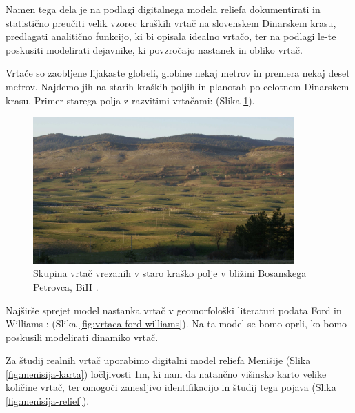 \documentclass[a4paper, twoside, 12pt]{book}
\begin{document}
  Namen tega dela je na podlagi digitalnega modela reliefa dokumentirati in statistično preučiti velik vzorec kraških vrtač na slovenskem Dinarskem krasu, predlagati analitično funkcijo, ki bi opisala idealno vrtačo, ter na podlagi le-te poskusiti modelirati dejavnike, ki povzročajo nastanek in obliko vrtač.

Vrtače so zaobljene lijakaste globeli, globine nekaj metrov in premera nekaj deset metrov. Najdemo jih na starih kraških poljih in planotah po celotnem Dinarskem krasu. Primer starega polja z razvitimi vrtačami: (Slika \ref{fig:vrtace-bpetrovac}). 

  \begin{figure}[h]
    \begin{center}
      \includegraphics[width=10cm]{slike/bpetrovac}
    \end{center}
    \caption{Skupina vrtač vrezanih v staro kraško polje v bližini Bosanskega Petrovca, BiH \cite{bpetrovac}.}
    \label{fig:vrtace-bpetrovac}
  \end{figure}

Najširše sprejet model nastanka vrtač v geomorfološki literaturi podata Ford in Williams \cite{ford2007karst}: (Slika \ref{fig:vrtaca-ford-williams}). Na ta model se bomo oprli, ko bomo poskusili modelirati dinamiko vrtač.

  Za študij realnih vrtač uporabimo digitalni model reliefa Menišije (Slika \ref{fig:menisija-karta}) ločljivosti 1m, ki nam da natančno višinsko karto velike količine vrtač, ter omogoči zanesljivo identifikacijo in študij tega pojava (Slika \ref{fig:menisija-relief}).
\end{document}
